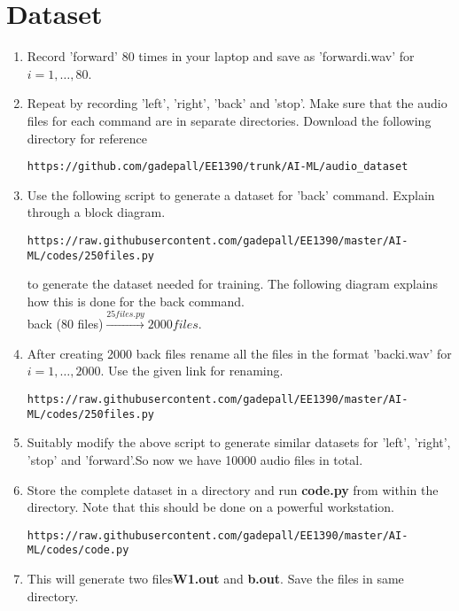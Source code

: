 \documentclass[journal,12pt,twocolumn]{IEEEtran}
\renewcommand\thesection{\arabic{section}}
\begin{document}
\section{Dataset}
%
\begin{enumerate}[label=\thesection.\arabic*
,ref=\thesection.\theenumi]


\item Record 'forward' 80 times in your laptop and save as 'forwardi.wav' for $i 
= 1,\dots, 80$.
%
\item Repeat by recording 'left', 'right', 'back' and 'stop'. Make sure that the 
audio files for each command are in separate directories. Download the following 
directory for reference
\begin{lstlisting}
https://github.com/gadepall/EE1390/trunk/AI-ML/audio_dataset
\end{lstlisting}
\item Use the following script to generate a dataset for 'back' command. Explain 
through a block diagram.
\begin{lstlisting}
https://raw.githubusercontent.com/gadepall/EE1390/master/AI-ML/codes/250files.py
\end{lstlisting}
%
\solution
to generate the dataset needed for training. The following diagram explains how this 
is done for the back command.
\\
back (80 files)$\overset{25files.py}{\rightarrow}2000 files$.
\item After creating 2000 back files rename all the files in the format 'backi.wav' for $i 
= 1,\dots, 2000$. 
Use the given link for renaming.
\begin{lstlisting}
https://raw.githubusercontent.com/gadepall/EE1390/master/AI-ML/codes/250files.py
\end{lstlisting}
%
\item Suitably modify the above script to generate similar datasets for 'left', 'right', 'stop' and 'forward'.So now we have 10000 audio files in total.
%

\item Store the complete dataset in a directory and run \textbf{code.py} from  within the 
directory.  Note that this should be done on a powerful workstation.
\begin{lstlisting}
https://raw.githubusercontent.com/gadepall/EE1390/master/AI-ML/codes/code.py
\end{lstlisting}
\item This will generate two files\textbf{W1.out} and \textbf{b.out}. Save the files in same directory.
\end{enumerate}
%
\end{document}
